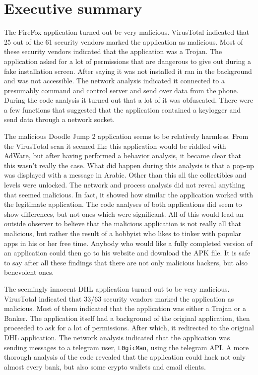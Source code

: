 \section*{Executive summary}
The FireFox application turned out be very malicious.
VirusTotal indicated that 25 out of the 61 security vendors marked the application as malicious.
Most of these security vendors indicated that the application was a Trojan.
The application asked for a lot of permissions that are dangerous to give out during a fake installation screen.
After saying it was not installed it ran in the background and was not accessible.
The network analysis indicated it connected to a presumably command and control server and send over data from the phone.
During the code analysis it turned out that a lot of it was obfuscated.
There were a few functions that suggested that the application contained a keylogger and send data through a network socket.

The malicious Doodle Jump 2 application seems to be relatively harmless.
From the VirusTotal scan it seemed like this application would be riddled with AdWare, but after having performed a behavior analysis, it became clear that this wasn’t really the case.
What did happen during this analysis is that a pop-up was displayed with a message in Arabic.
Other than this all the collectibles and levels were unlocked.
The network and process analysis did not reveal anything that seemed malicious.
In fact, it showed how similar the application worked with the legitimate application.
The code analyses of both applications did seem to show differences, but not ones which were significant.
All of this would lead an outside observer to believe that the malicious application is not really all that malicious, but rather the result of a hobbyist who likes to tinker with popular apps in his or her free time.
Anybody who would like a fully completed version of an application could then go to his website and download the APK file.
It is safe to say after all these findings that there are not only malicious hackers, but also benevolent ones.

The seemingly innocent DHL application turned out to be very malicious.
VirusTotal indicated that 33/63 security vendors marked the application as malicious.
Most of them indicated that the application was either a Trojan or a Banker.
The application itself had a background of the original application, then proceeded to ask for a lot of permissions.
After which, it redirected to the original DHL application.
The network analysis indicated that the application was sending messages to a telegram user, \texttt{L0gicMan}, using the telegram API.
A more thorough analysis of the code revealed that the application could hack not only almost every bank, but also some crypto wallets and email clients.

